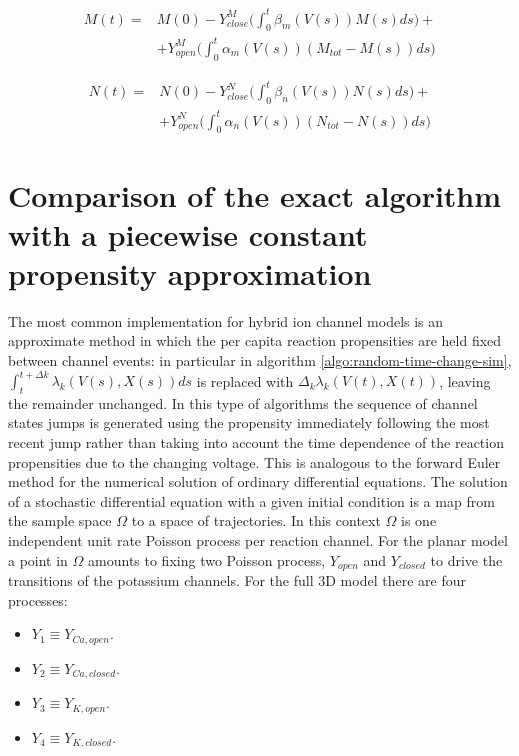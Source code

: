 	\begin{align*}
		M(t) =&M(0) - Y_{close}^M\biggl(\int_0^t\beta_m(V(s))M(s)ds\biggr)+\\
					&+Y_{open}^M\biggl(\int_0^t\alpha_m(V(s))(M_{tot}-M(s))ds\biggr)
	\end{align*}

	\begin{align*}
		N(t) =&N(0) - Y_{close}^N\biggl(\int_0^t\beta_n(V(s))N(s)ds\biggr)+\\
					&+Y_{open}^N\biggl(\int_0^t\alpha_n(V(s))(N_{tot}-N(s))ds\biggr)
	\end{align*}

\section{Comparison of the exact algorithm with a piecewise constant propensity approximation}
The most common implementation for hybrid ion channel models is an approximate method in which the per capita reaction propensities are held fixed between channel events: in particular in algorithm \ref{algo:random-time-change-sim}, $\int_t^{t+\Delta k}\lambda_k(V(s), X(s))ds$ is replaced with $\Delta_k\lambda_k(V(t), X(t))$, leaving the remainder unchanged.
In this type of algorithms the sequence of channel states jumps is generated using the propensity immediately following the most recent jump rather than taking into account the time dependence of the reaction propensities due to the changing voltage.
This is analogous to the forward Euler method for the numerical solution of ordinary differential equations.
The solution of a stochastic differential equation with a given initial condition is a map from the sample space $\Omega$ to a space of trajectories.
In this context $\Omega$ is one independent unit rate Poisson process per reaction channel.
For the planar model a point in $\Omega$ amounts to fixing two Poisson process, $Y_{open}$ and $Y_{closed}$ to drive the transitions of the potassium channels.
For the full 3D model there are four processes:

\begin{multicols}{2}
	\begin{itemize}
		\item $Y_1 \equiv Y_{Ca, open}$.
		\item $Y_2 \equiv Y_{Ca, closed}$.
		\item $Y_3 \equiv Y_{K, open}$.
		\item $Y_4 \equiv Y_{K, closed}$.
	\end{itemize}
\end{multicols}

